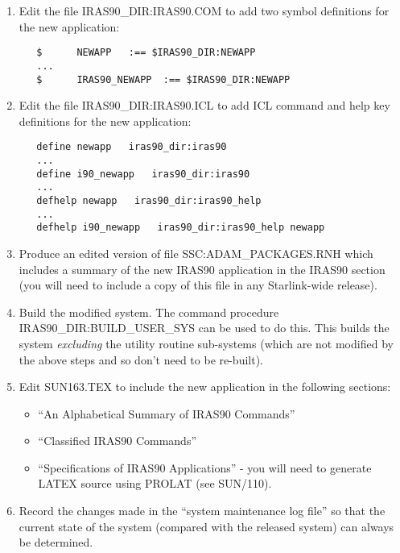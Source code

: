 \begin{enumerate}
\item Edit the file {\small IRAS90\_DIR:IRAS90.COM} to add two symbol
definitions for the new application:

\small
\begin{verbatim}
   $      NEWAPP   :== $IRAS90_DIR:NEWAPP
   ...
   $      IRAS90_NEWAPP  :== $IRAS90_DIR:NEWAPP
\end{verbatim}
\normalsize

\item Edit the file {\small IRAS90\_DIR:IRAS90.ICL} to add {\small ICL}
command and help key definitions for the new application:

\small
\begin{verbatim}
   define newapp   iras90_dir:iras90
   ...
   define i90_newapp   iras90_dir:iras90
   ...
   defhelp newapp   iras90_dir:iras90_help
   ...
   defhelp i90_newapp   iras90_dir:iras90_help newapp
\end{verbatim}
\normalsize

\item Produce an edited version of file {\small SSC:ADAM\_PACKAGES.RNH} which
includes a summary of the new {\small IRAS90} application in the {\small IRAS90}
section (you will need to include a copy of this file in any Starlink-wide
release).

\item Build the modified system. The command procedure {\small
IRAS90\_DIR:BUILD\_USER\_SYS} can be used to do this. This builds the system
{\em excluding} the utility routine sub-systems (which are not modified by the
above steps and so don't need to be re-built).

\item Edit {\small SUN163.TEX} to include the new application in the following
sections:
\begin{itemize}
\item ``An Alphabetical Summary of {\small IRAS90} Commands''
\item ``Classified {\small IRAS90} Commands''
\item ``Specifications of {\small IRAS90} Applications'' - you will need to
generate {\small LATEX} source using {\small PROLAT} (see SUN/110).
\end{itemize}

\item Record the changes made in the ``system maintenance log file'' so that the
current state of the system (compared with the released system) can
always be determined.

\end{enumerate}

